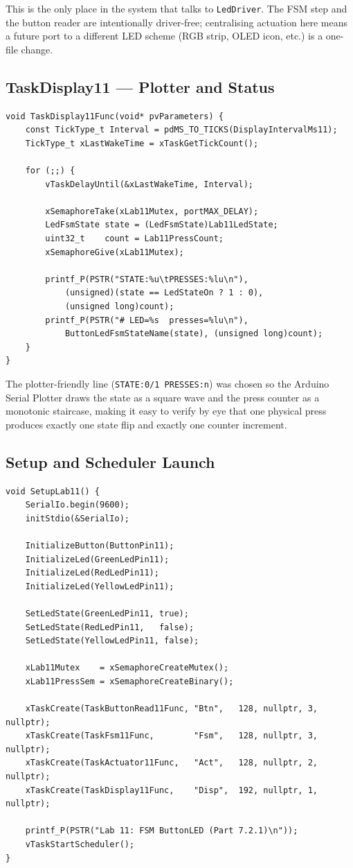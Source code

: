 \documentclass[12pt]{article}
\begin{document}
This is the only place in the system that talks to \texttt{LedDriver}. The FSM step and the button reader are intentionally driver-free; centralising actuation here means a future port to a different LED scheme (RGB strip, OLED icon, etc.) is a one-file change.

\subsection{TaskDisplay11 --- Plotter and Status}

\begin{lstlisting}[caption={TaskDisplay11.cpp --- 500\,ms diagnostic output}]
void TaskDisplay11Func(void* pvParameters) {
    const TickType_t Interval = pdMS_TO_TICKS(DisplayIntervalMs11);
    TickType_t xLastWakeTime = xTaskGetTickCount();

    for (;;) {
        vTaskDelayUntil(&xLastWakeTime, Interval);

        xSemaphoreTake(xLab11Mutex, portMAX_DELAY);
        LedFsmState state = (LedFsmState)Lab11LedState;
        uint32_t    count = Lab11PressCount;
        xSemaphoreGive(xLab11Mutex);

        printf_P(PSTR("STATE:%u\tPRESSES:%lu\n"),
            (unsigned)(state == LedStateOn ? 1 : 0),
            (unsigned long)count);
        printf_P(PSTR("# LED=%s  presses=%lu\n"),
            ButtonLedFsmStateName(state), (unsigned long)count);
    }
}
\end{lstlisting}

The plotter-friendly line (\texttt{STATE:0/1  PRESSES:n}) was chosen so the Arduino Serial Plotter draws the state as a square wave and the press counter as a monotonic staircase, making it easy to verify by eye that one physical press produces exactly one state flip and exactly one counter increment.

\subsection{Setup and Scheduler Launch}

\begin{lstlisting}[caption={MainLab11.cpp --- task creation and welcome banner}]
void SetupLab11() {
    SerialIo.begin(9600);
    initStdio(&SerialIo);

    InitializeButton(ButtonPin11);
    InitializeLed(GreenLedPin11);
    InitializeLed(RedLedPin11);
    InitializeLed(YellowLedPin11);

    SetLedState(GreenLedPin11, true);
    SetLedState(RedLedPin11,   false);
    SetLedState(YellowLedPin11, false);

    xLab11Mutex    = xSemaphoreCreateMutex();
    xLab11PressSem = xSemaphoreCreateBinary();

    xTaskCreate(TaskButtonRead11Func, "Btn",   128, nullptr, 3, nullptr);
    xTaskCreate(TaskFsm11Func,        "Fsm",   128, nullptr, 3, nullptr);
    xTaskCreate(TaskActuator11Func,   "Act",   128, nullptr, 2, nullptr);
    xTaskCreate(TaskDisplay11Func,    "Disp",  192, nullptr, 1, nullptr);

    printf_P(PSTR("Lab 11: FSM ButtonLED (Part 7.2.1)\n"));
    vTaskStartScheduler();
}
\end{lstlisting}
\end{document}
